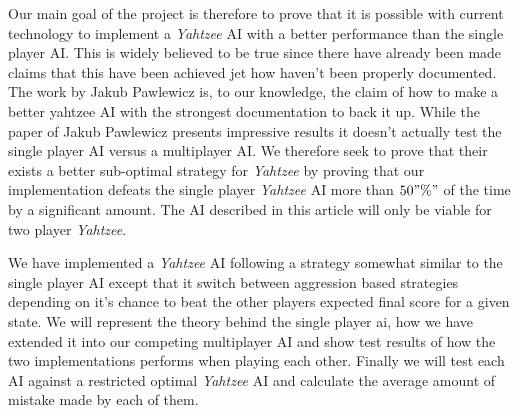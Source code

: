 Our main goal of the project is therefore to prove that it is possible with current technology to implement a \emph{Yahtzee} AI with a better performance than the single player AI. 
This is widely believed to be true since there have already been made claims that this have been achieved jet how haven't been properly documented.
The work by Jakub Pawlewicz is, to our knowledge, the claim of how to make a better yahtzee AI with the strongest documentation to back it up. 
While the paper of Jakub Pawlewicz\citep{pawlewicz2011nearly} presents impressive results it doesn't actually test the single player AI versus a multiplayer AI.
We therefore seek to prove that their exists a better sub-optimal strategy for \emph{Yahtzee} by proving that our implementation defeats the single player \emph{Yahtzee} AI more than $50"\%" $ of the time by a significant amount. The AI described in this article will only be viable for two player \emph{Yahtzee}.

We have implemented a \emph{Yahtzee} AI following a strategy somewhat similar to the single player AI except that it switch between aggression based strategies depending on it's chance to beat the other players expected final score for a given state. 
We will represent the theory behind the single player ai, how we have extended it into our competing multiplayer AI and show test results of how the two implementations performs when playing each other. 
Finally we will test each AI against a restricted optimal \emph{Yahtzee} AI and calculate the average amount of mistake made by each of them.

